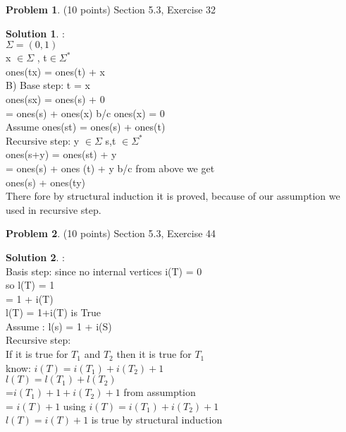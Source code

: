 \documentclass{article}
\theoremstyle{definition}
\newtheorem{problem}{Problem}
\newtheorem*{solution}{Solution}
\begin{document}
\begin{problem} (10 points) Section 5.3, Exercise 32
\end{problem}
\begin{solution}:
\\
$\Sigma = (0,1)$
\\
x $\in \Sigma$ , t$\in \Sigma ^*$
\\
ones(tx) = ones(t) + x
\\
B) Base step: t = x
\\
ones(sx) = ones(s) + 0
\\
= ones(s) + ones(x) b/c ones(x) = 0 
\\
Assume ones(st) = ones(s) + ones(t)
\\
Recursive step: y $\in \Sigma$ s,t $\in \Sigma ^*$
\\
ones(s+y) = ones(st) + y
\\
= ones(s) + ones (t) + y b/c from above we get
\\
ones(s) + ones(ty)
\\
There fore by structural induction it is proved, because of our assumption we used in recursive step.

\end{solution}

\newpage

\begin{problem} (10 points) Section 5.3, Exercise 44
\end{problem}
\begin{solution}:
\\
Basis step: since no internal vertices i(T) = 0
\\
so l(T) = 1
\\
= 1 + i(T)
\\
l(T) = 1+i(T) is True
\\
Assume : l(s) = 1 + i(S)
\\
Recursive step:
\\
If it is true for $T_1$ and $T_2$ then it is true for $T_1$
\\
know: $i(T) = i(T_1) + i(T_2) + 1$
\\
$l(T) = l(T_1) + l(T_2)$
\\
=$ i(T_1) + 1 + i(T_2) + 1$ from assumption
\\
= $i(T) + 1$ using $i(T) = i(T_1) + i(T_2) + 1$
\\
$l(T) = i(T) + 1$ is true by structural induction

\end{solution}
\end{document}
